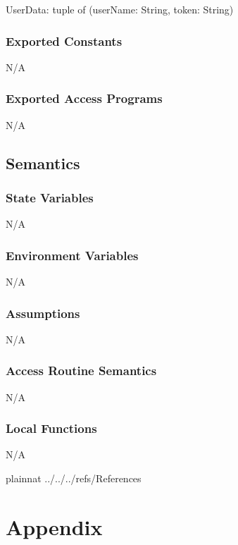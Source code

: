 \documentclass[12pt, titlepage]{article}
\begin{document}
	UserData: tuple of (userName: String, token: String)
	
	\subsubsection{Exported Constants}
	N/A
	
	\subsubsection{Exported Access Programs}
	N/A
	
	\subsection{Semantics}
	
	\subsubsection{State Variables}
	N/A
	
	\subsubsection{Environment Variables}
	N/A
	
	\subsubsection{Assumptions}
	N/A
	
	\subsubsection{Access Routine Semantics}
	N/A
	
	\subsubsection{Local Functions}
	N/A
	
	\newpage
	
	
	
	 {plainnat}
	 {../../../refs/References}
	
	\newpage
	
	\section{Appendix} \label{Appendix}
	
	
\end{document}
